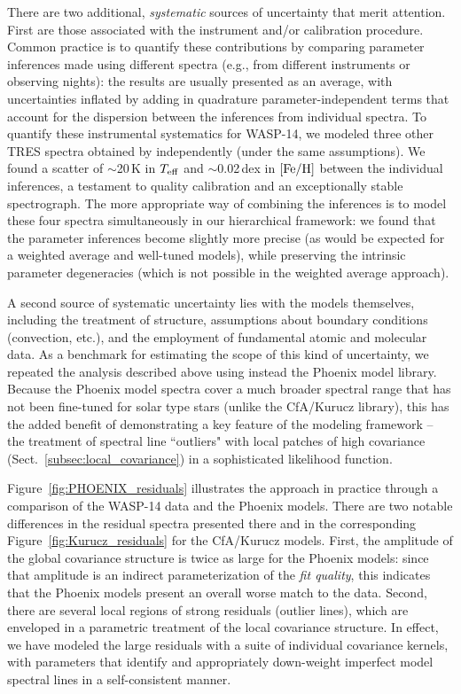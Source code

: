 \documentclass[iop,floatfix,numberedappendix,twocolappendix]{emulateapj}
\newcommand{\Z}{[{\rm Fe}/{\rm H}]}
\begin{document}
There are two additional, {\it systematic} sources of uncertainty that merit attention.  First are 
those associated with the instrument and/or calibration procedure.  Common practice is to quantify 
these contributions by comparing parameter inferences made using different spectra (e.g., from 
different instruments or observing nights): the results are usually presented as an average, with 
uncertainties inflated by adding in quadrature parameter-independent terms that account for the 
dispersion between the inferences from individual spectra.  To quantify these instrumental 
systematics for WASP-14, we modeled three other TRES spectra obtained by \citet{torres12} 
independently (under the same assumptions).  We found a scatter of $\sim$20\,K in $T_{\rm eff}$ and 
$\sim$0.02\,dex in $\Z$ between the individual inferences, a testament to quality calibration and 
an exceptionally stable spectrograph.  The more appropriate way of combining the inferences is to 
model these four spectra simultaneously in our hierarchical framework: we found that the parameter 
inferences become slightly more precise (as would be expected for a weighted average and well-tuned 
models), while preserving the intrinsic parameter degeneracies (which is not possible in the 
weighted average approach).

A second source of systematic uncertainty lies with the models themselves, including the treatment 
of structure, assumptions about boundary conditions (convection, etc.), and the employment of 
fundamental atomic and molecular data.  As a benchmark for estimating the scope of this kind of 
uncertainty, we repeated the analysis described above using instead the {\sc Phoenix} model 
library.  Because the {\sc Phoenix} model spectra cover a much broader spectral range that has not 
been fine-tuned for solar type stars (unlike the {\sc CfA/Kurucz} library), this has the added 
benefit of demonstrating a key feature of the modeling framework -- the treatment of spectral line 
``outliers" with local patches of high covariance (Sect.~\ref{subsec:local_covariance}) in a 
sophisticated likelihood function.  

Figure~\ref{fig:PHOENIX_residuals} illustrates the approach in practice through a comparison of the 
WASP-14 data and the {\sc Phoenix} models.  There are two notable differences in the residual 
spectra presented there and in the corresponding Figure~\ref{fig:Kurucz_residuals} for the {\sc 
CfA/Kurucz} models.  First, the amplitude of the global covariance structure is twice as large for 
the {\sc Phoenix} models: since that amplitude is an indirect parameterization of the {\it fit 
quality}, this indicates that the {\sc Phoenix} models present an overall worse match to the 
data.  Second, there are several local regions of strong residuals (outlier lines), which are 
enveloped in a parametric treatment of the local covariance structure.  In effect, we have modeled 
the large residuals with a suite of individual covariance kernels, with parameters that identify 
and appropriately down-weight imperfect model spectral lines in a self-consistent manner.
\end{document}
